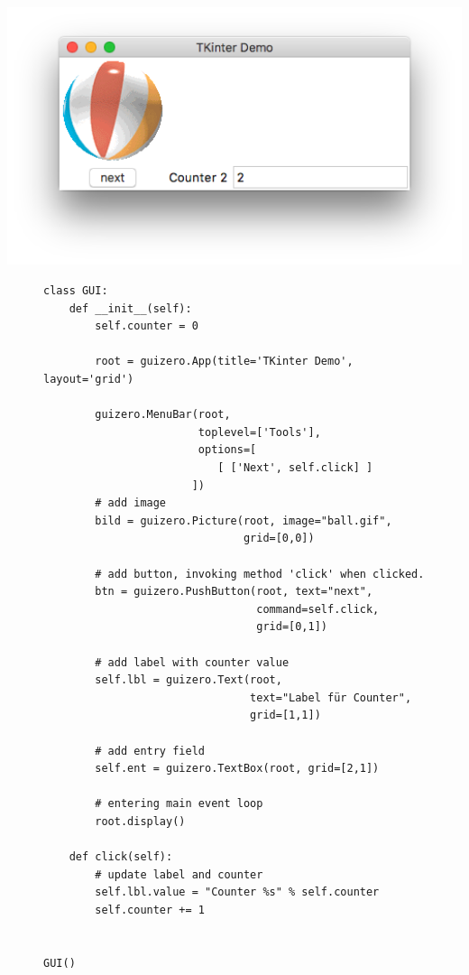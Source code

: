 \documentclass{tufte-handout}
\begin{document}
\begin{marginfigure}[3cm]
	\begin{center}
		\includegraphics[width=1.2\textwidth]{../complex_demo.png}
	\end{center}	
\end{marginfigure}

\begin{figure}
	\begin{lstlisting}
class GUI:
    def __init__(self):
        self.counter = 0

        root = guizero.App(title='TKinter Demo', layout='grid')

        guizero.MenuBar(root,
                        toplevel=['Tools'],
                        options=[
                           [ ['Next', self.click] ]
                       ])
        # add image
        bild = guizero.Picture(root, image="ball.gif",
                               grid=[0,0])

        # add button, invoking method 'click' when clicked.
        btn = guizero.PushButton(root, text="next", 
                                 command=self.click,
                                 grid=[0,1])

        # add label with counter value
        self.lbl = guizero.Text(root, 
                                text="Label für Counter",
                                grid=[1,1])

        # add entry field
        self.ent = guizero.TextBox(root, grid=[2,1])

        # entering main event loop
        root.display()

    def click(self):
        # update label and counter
        self.lbl.value = "Counter %s" % self.counter
        self.counter += 1


GUI()	
\end{lstlisting}
\end{figure} 
 
\end{document}
